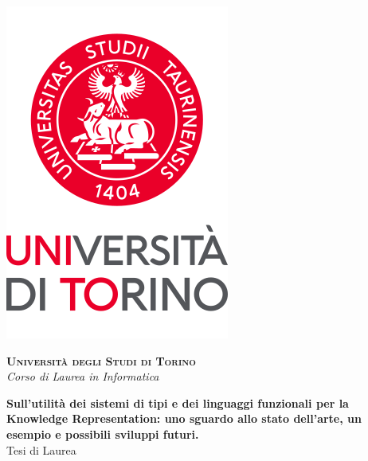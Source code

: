 \begin{titlepage}
	{

    \begin{center}
        \includegraphics[scale=.4]{head/logo.png}
    \end{center}
    \begin{center}
        \vspace{5mm}
        {\Large
        	{\textsc
        		{\bf Universit\`a degli Studi di Torino\\} 
        		\vspace{2mm}
        		\emph{Corso di Laurea in Informatica}
        	}
       	}
        \vspace{5mm}
    \end{center}
    \begin{center}
        \vspace{5mm}
        {\bf Sull'utilità dei sistemi di tipi e dei linguaggi funzionali per la Knowledge Representation: uno sguardo allo stato dell’arte, un esempio e possibili sviluppi futuri.\\} %
        \vspace{3mm}
        {\large{Tesi di Laurea\\}}
    \end{center}
    \vspace{5mm}
    \par
    \noindent
}
\end{titlepage}
